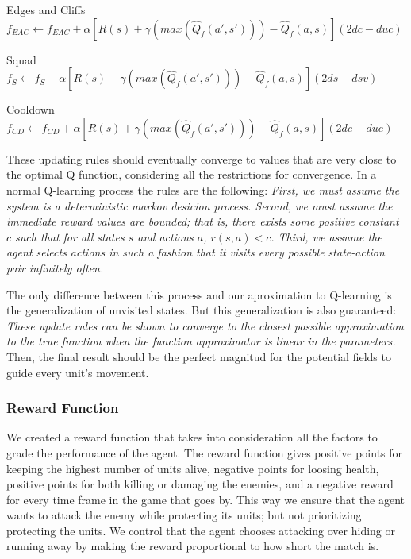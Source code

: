 \begin{flushleft}
Edges and Cliffs
$f_{EAC}  \leftarrow f_{EAC}  + \alpha [ R(s) + \gamma (max(\hat{Q}_{f} (a',s')))-\hat{Q}_{f} (a,s) ] (2dc - duc)$ 
\end{flushleft} 

\begin{flushleft}
Squad  \\ 
$f_{S}  \leftarrow f_{S}  + \alpha [ R(s) + \gamma (max(\hat{Q}_{f} (a',s')))-\hat{Q}_{f} (a,s) ] (2ds - dsv)$
\end{flushleft} 

\begin{flushleft}
Cooldown  \\ 
$f_{CD}  \leftarrow f_{CD}  + \alpha [ R(s) + \gamma (max(\hat{Q}_{f} (a',s')))-\hat{Q}_{f} (a,s) ](2de - due)$ 
\end{flushleft} 

These updating rules should eventually converge to values that are very close to the optimal Q function, considering all the restrictions for convergence. In a normal Q-learning process the rules are the following: \textit{First, we must assume the system is a deterministic markov desicion process. Second, we must assume the immediate reward values are bounded; that is, there exists some positive constant $c$ such that for all states $s$ and actions $a$, $r(s,a) < c$. Third, we assume the agent selects actions in such a fashion that it visits every possible state-action pair infinitely often.} \cite[p377]{ml_tom_mitchel} 



The only difference between this process and our aproximation to Q-learning is the generalization of unvisited states. But this generalization is also guaranteed: \textit{These update rules can be shown to converge to the closest possible approximation to the true function when the function approximator is linear in the parameters. }\cite[p779]{rl} Then, the final result should be the perfect magnitud for the potential fields to guide every unit's movement.

\subsubsection{Reward Function}

We created a reward function that takes into consideration all the factors to grade the performance of the agent. The reward function gives positive points for keeping the highest number of units alive, negative points for loosing health, positive points for both killing or damaging the enemies, and a negative reward for every time frame in the game that goes by. This way we ensure that the agent wants to attack the enemy while protecting its units; but not prioritizing protecting the units. We control that the agent chooses attacking over hiding or running away by making the reward proportional to how short the match is. \\ 

